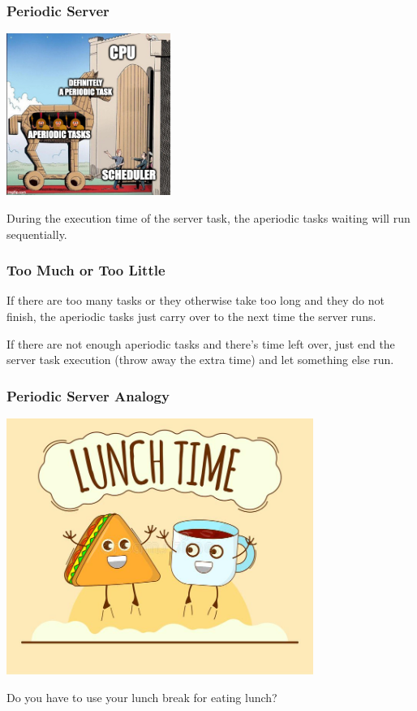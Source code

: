 \begin{frame}
\frametitle{Periodic Server}

\begin{center}
	\includegraphics[width=0.4\textwidth]{images/periodic-server.jpg}
\end{center}

During the execution time of the server task, the aperiodic tasks waiting will run sequentially.

\end{frame}

\begin{frame}
\frametitle{Too Much or Too Little}

If there are too many tasks or they otherwise take too long and they do not finish, the aperiodic tasks just carry over to the next time the server runs. 

If there are not enough aperiodic tasks and there's time left over, just end the server task execution (throw away the extra time) and let something else run.

\end{frame}

\begin{frame}
\frametitle{Periodic Server Analogy}

\begin{center}
	\includegraphics[width=0.75\textwidth]{images/lunchtime.jpg}
\end{center}

Do you have to use your lunch break for eating lunch?

\end{frame}

